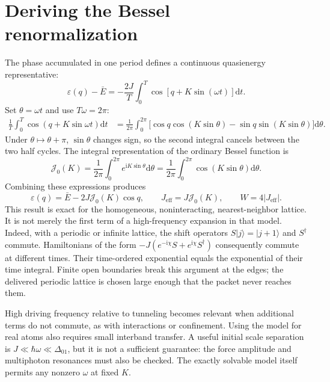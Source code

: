 \documentclass[11pt,oneside]{report}
\numberwithin{equation}{chapter}
\newcommand{\Jeff}{J_{\mathrm{eff}}}
\newcommand{\ii}{\mathrm i}
\newcommand{\dd}{\mathrm d}
\newcommand{\ket}[1]{\lvert #1\rangle}
\begin{document}
\section{Deriving the Bessel renormalization}
The phase accumulated in one period defines a continuous quasienergy representative:
\begin{equation}\label{eq:quasiaverage}
 \varepsilon(q)-\bar E=-\frac{2J}{T}\int_0^T\cos[q+K\sin(\omega t)]\dd t.
\end{equation}
Set $\theta=\omega t$ and use $T\omega=2\pi$:
\begin{align}
 \frac{1}{T}\int_0^T\cos(q+K\sin\omega t)\dd t
 &=\frac{1}{2\pi}\int_0^{2\pi}\big[\cos q\cos(K\sin\theta)-\sin q\sin(K\sin\theta)\big]\dd\theta.\label{eq:besselintegral}
\end{align}
Under $\theta\mapsto\theta+\pi$, $\sin\theta$ changes sign, so the second integral cancels between the two half cycles. The integral representation of the ordinary Bessel function is
\begin{equation}
 \mathcal J_0(K)=\frac{1}{2\pi}\int_0^{2\pi}e^{\ii K\sin\theta}\dd\theta
 =\frac{1}{2\pi}\int_0^{2\pi}\cos(K\sin\theta)\dd\theta.
\end{equation}
Combining these expressions produces
\begin{equation}\label{eq:Besselresult}
 \boxed{\varepsilon(q)=\bar E-2J\mathcal J_0(K)\cos q,\qquad \Jeff=J\mathcal J_0(K),\qquad W=4|\Jeff|.}
\end{equation}
This result is exact for the homogeneous, noninteracting, nearest-neighbor lattice. It is not merely the first term of a high-frequency expansion in that model. Indeed, with a periodic or infinite lattice, the shift operators $S\ket j=\ket{j+1}$ and $S^\dagger$ commute. Hamiltonians of the form $-J(e^{-\ii\chi}S+e^{\ii\chi}S^\dagger)$ consequently commute at different times. Their time-ordered exponential equals the exponential of their time integral. Finite open boundaries break this argument at the edges; the delivered periodic lattice is chosen large enough that the packet never reaches them.

High driving frequency relative to tunneling becomes relevant when additional terms do not commute, as with interactions or confinement. Using the model for real atoms also requires small interband transfer. A useful initial scale separation is $J\ll\hbar\omega\ll\Delta_{01}$, but it is not a sufficient guarantee: the force amplitude and multiphoton resonances must also be checked. The exactly solvable model itself permits any nonzero $\omega$ at fixed $K$.
\end{document}
